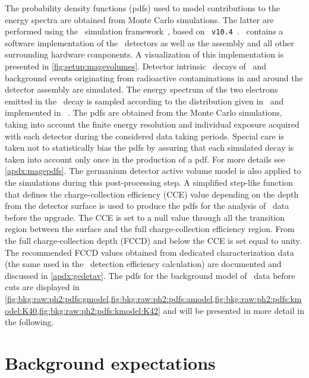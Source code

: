 The probability density functions (pdfs) used to model contributions to the energy spectra
are obtained from Monte Carlo simulations. The latter are performed using the \mage\
simulation framework~\cite{Boswell2011}, based on
\geant~\texttt{v10.4}~\cite{Agostinelli2002, Allison2006, Allison2016}.  \mage\ contains a
software implementation of the \gerdatwo\ detectors as well as the assembly and all other
surrounding hardware components. A visualization of this implementation is presented in
\cref{fig:setup:magevolumes}. Detector intrinsic \nnbb\ decays of \gesix\ and background
events originating from radioactive contaminations in and around the detector assembly are
simulated. The energy spectrum of the two electrons emitted in the \nnbb\ decay is
sampled according to the distribution given in~\cite{Tretyak1995} and implemented in
\decayzero~\cite{Ponkratenko2000}. The pdfs are obtained from the Monte Carlo simulations,
taking into account the finite energy resolution and individual exposure acquired with
each detector during the considered data taking periods. Special care is taken not to
statistically bias the pdfs by assuring that each simulated decay is taken into account
only once in the production of a pdf. For more details see \cref{apdx:magepdfs}. The
germanium detector active volume model is also applied to the simulations during this
post-processing step. A simplified step-like function that defines the charge-collection
efficiency (CCE) value depending on the depth from the detector surface is used to produce
the pdfs for the analysis of \phasetwo\ data before the upgrade. The CCE is set to a null
value through all the transition region between the surface and the full charge-collection
efficiency region. From the full charge-collection depth (FCCD) and below the CCE is set
equal to unity. The recommended FCCD values obtained from dedicated characterization data
(the same used in the \onbb\ detection efficiency calculation) are documented and
discussed in \cref{apdx:gedetav}. The pdfs for the background model of \gerdatwo\ data
before cuts are displayed in
\cref{fig:bkg:raw:ph2:pdfs:gmodel,fig:bkg:raw:ph2:pdfs:amodel,fig:bkg:raw:ph2:pdfs:kmodel:K40,fig:bkg:raw:ph2:pdfs:kmodel:K42}
and will be presented in more detail in the following.

\section{Background expectations}%
\label{sec:bkg:raw:ph2:priors}

